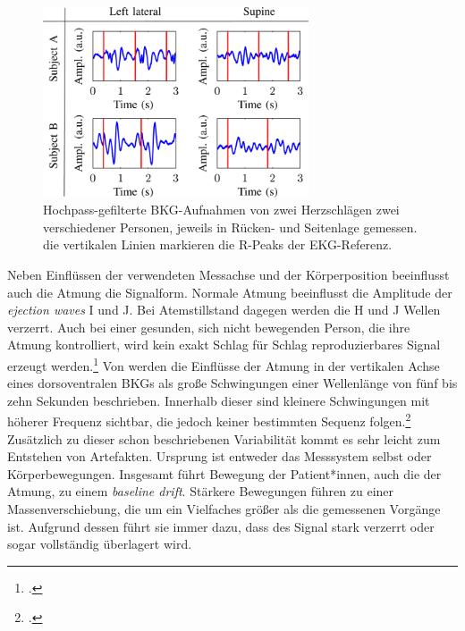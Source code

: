 	\begin{figure}[H]
		\centering
		\includegraphics[width=0.7\textwidth]{pic/bcg2postures.png}
		\caption{Hochpass-gefilterte \ac{BKG}-Aufnahmen von zwei Herzschlägen zwei verschiedener Personen, jeweils in Rücken- und Seitenlage gemessen. die vertikalen Linien markieren die R-Peaks der EKG-Referenz.\protect\footnotemark}
		\label{fig:bcg2postures}
	\end{figure}
	
	Neben Einflüssen der verwendeten Messachse und der Körperposition beeinflusst auch die Atmung die Signalform. Normale Atmung beeinflusst die Amplitude der \textit{ejection waves} I und J. Bei Atemstillstand dagegen werden die H und J Wellen verzerrt. Auch bei einer gesunden, sich nicht bewegenden Person, die ihre Atmung kontrolliert, wird kein exakt Schlag für Schlag reproduzierbares Signal erzeugt werden.\footcite[Vgl.][]{Pinheiro2010} Von \citeauthor{Zink2017} werden die Einflüsse der Atmung in der vertikalen Achse eines dorsoventralen \ac{BKG}s als große Schwingungen einer Wellenlänge von fünf bis zehn Sekunden beschrieben. Innerhalb dieser sind kleinere Schwingungen mit höherer Frequenz sichtbar, die jedoch keiner bestimmten Sequenz folgen.\footcite[Vgl.][]{Zink2017} Zusätzlich zu dieser schon beschriebenen Variabilität kommt es sehr leicht zum Entstehen von Artefakten. Ursprung ist entweder das Messsystem selbst oder Körperbewegungen. Insgesamt führt Bewegung der Patient*innen, auch die der Atmung, zu einem \textit{baseline drift}. Stärkere Bewegungen führen zu einer Massenverschiebung, die um ein Vielfaches größer als die gemessenen Vorgänge ist. Aufgrund dessen führt sie immer dazu, dass des Signal stark verzerrt oder sogar vollständig überlagert wird.
	

